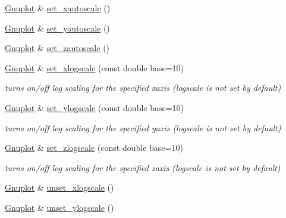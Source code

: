 \begin{DoxyCompactItemize}
\mbox{\hyperlink{class_gnuplot}{Gnuplot}} \& \mbox{\hyperlink{class_gnuplot_a11a62a04c203f01607c3c21a727e318d}{set\+\_\+xautoscale}} ()
\item 
\mbox{\hyperlink{class_gnuplot}{Gnuplot}} \& \mbox{\hyperlink{class_gnuplot_a5b9e1a4e68f94d418a8e9194f168b448}{set\+\_\+yautoscale}} ()
\item 
\mbox{\hyperlink{class_gnuplot}{Gnuplot}} \& \mbox{\hyperlink{class_gnuplot_aef3e84e793836158e1ddd773d1465c37}{set\+\_\+zautoscale}} ()
\item 
\mbox{\label{class_gnuplot_aff546fad227d93babeb5d2cc9f047b89}} 
\mbox{\hyperlink{class_gnuplot}{Gnuplot}} \& \mbox{\hyperlink{class_gnuplot_aff546fad227d93babeb5d2cc9f047b89}{set\+\_\+xlogscale}} (const double base=10)
\begin{DoxyCompactList}\small\item\em turns on/off log scaling for the specified xaxis (logscale is not set by default) \end{DoxyCompactList}\item 
\mbox{\label{class_gnuplot_a201a802d2f27fece0d39809c4eb3bce0}} 
\mbox{\hyperlink{class_gnuplot}{Gnuplot}} \& \mbox{\hyperlink{class_gnuplot_a201a802d2f27fece0d39809c4eb3bce0}{set\+\_\+ylogscale}} (const double base=10)
\begin{DoxyCompactList}\small\item\em turns on/off log scaling for the specified yaxis (logscale is not set by default) \end{DoxyCompactList}\item 
\mbox{\label{class_gnuplot_a1da3838163b0dbde8809b55c5b5c56b1}} 
\mbox{\hyperlink{class_gnuplot}{Gnuplot}} \& \mbox{\hyperlink{class_gnuplot_a1da3838163b0dbde8809b55c5b5c56b1}{set\+\_\+zlogscale}} (const double base=10)
\begin{DoxyCompactList}\small\item\em turns on/off log scaling for the specified zaxis (logscale is not set by default) \end{DoxyCompactList}\item 
\mbox{\hyperlink{class_gnuplot}{Gnuplot}} \& \mbox{\hyperlink{class_gnuplot_a7b178184260f1498cd0c11a197ea0ac2}{unset\+\_\+xlogscale}} ()
\item 
\mbox{\hyperlink{class_gnuplot}{Gnuplot}} \& \mbox{\hyperlink{class_gnuplot_a9217543dd49c4802b1194d42c5e10b6d}{unset\+\_\+ylogscale}} ()

\end{DoxyCompactItemize}
